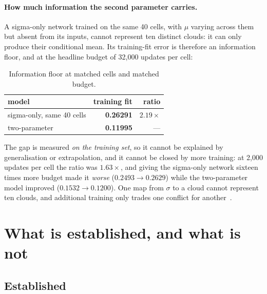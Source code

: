 ﻿\documentclass[11pt,a4paper]{article}
\newcommand{\strong}{\textcolor{green!35!black}{\textbullet\!\textbullet\!\textbullet}}
\begin{document}
\paragraph{How much information the second parameter carries.} A sigma-only network trained on
the same 40 cells, with $\mu$ varying across them but absent from its inputs, cannot represent
ten distinct clouds: it can only produce their conditional mean. Its training-fit error is
therefore an information floor, and at the headline budget of 32{,}000 updates per cell:

\begin{table}[h]
\centering\small
\begin{tabular}{@{}lrr@{}}
\toprule
model & training fit & ratio \\
\midrule
sigma-only, same 40 cells & \textbf{0.26291} & \textbf{$2.19\times$} \\
two-parameter & \textbf{0.11995} & --- \\
\bottomrule
\end{tabular}
\caption{Information floor at matched cells and matched budget.}
\end{table}

The gap is measured \emph{on the training set}, so it cannot be explained by generalisation or
extrapolation, and it cannot be closed by more training: at 2{,}000 updates per cell the ratio
was $1.63\times$, and giving the sigma-only network sixteen times more budget made it
\emph{worse} ($0.2493\to0.2629$) while the two-parameter model improved ($0.1532\to0.1200$). One
map from $\sigma$ to a cloud cannot represent ten clouds, and additional training only trades one
conflict for another~\strong.

\section{What is established, and what is not}

\subsection{Established}
\end{document}
